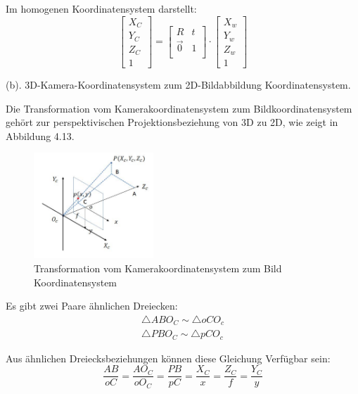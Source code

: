 Im homogenen Koordinatensystem darstellt:
\begin{equation}
   \begin{bmatrix}
	X_C \\  
	Y_C \\
	Z_C \\
	1
	\end{bmatrix} = \begin{bmatrix}
	R & t	\\
	\vec{0}	& 1 \\
	\end{bmatrix} \cdot \begin{bmatrix}
	X_w \\  
	Y_w \\
	Z_w \\
	1
	\end{bmatrix}
\end{equation}

(b). 3D-Kamera-Koordinatensystem zum 2D-Bildabbildung Koordinatensystem.

Die Transformation vom Kamerakoordinatensystem zum Bildkoordinatensystem gehört zur perspektivischen Projektionsbeziehung von 3D zu 2D, wie zeigt in Abbildung 4.13.

\begin{figure}[H]
 \centering 
 \includegraphics[keepaspectratio,width=0.4\textwidth]{images/4_ZweiteErfahrung/Kamera/Czuimage.pdf}
 \caption{Transformation vom Kamerakoordinatensystem zum Bild Koordinatensystem}
 \label{fig:Czuimage}
\end{figure} 

Es gibt zwei Paare ähnlichen Dreiecken:
\begin{equation}
   \begin{split}
    \triangle ABO_C \sim \triangle oCO_c\\  
	\triangle PBO_C \sim \triangle pCO_c
	\end{split}
\end{equation}

Aus ähnlichen Dreiecksbeziehungen können diese Gleichung Verfügbar sein:
\begin{equation}
   \frac{AB}{oC} = \frac{AO_C}{oO_C} = \frac{PB}{pC} = \frac{X_C}{x} = \frac{Z_C}{f} = \frac{Y_C}{y} 
\end{equation}

